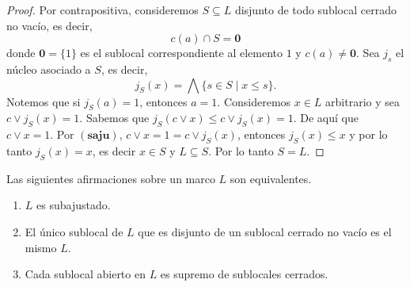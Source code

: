 \documentclass{comunicaciones}
\begin{document}
\begin{proof}
    Por contrapositiva, consideremos $S\subseteq L$ disjunto de todo sublocal cerrado no vacío, es decir, 
    \[c(a)\cap S=\mathbf{0}\]
    donde $\mathbf{0}=\{1\}$ es el sublocal correspondiente al elemento $1$ y $c(a)\neq \mathbf{0}$. Sea $j_s$ el núcleo asociado a $S$, es decir,
    \[
    j_S(x)=\bigwedge\{s\in S\mid x\leq s\}.
    \]
    Notemos que si $j_S(a)=1$, entonces $a=1$. Consideremos $x\in L$ arbitrario y sea $c\vee j_S(x)=1$. Sabemos que $j_S(c\vee x)\leq c\vee j_S(x)=1$. De aquí que $c\vee x=1$. Por $(\mathbf{saju})$, $c\vee x=1=c\vee j_S(x)$, entonces $j_S(x)\leq x$ y por lo tanto $j_S(x)=x$, es decir $x\in S$ y $L\subseteq S$. Por lo tanto $S=L$. 
\end{proof}

\begin{thm}\label{Saju2orden}
    Las siguientes afirmaciones sobre un marco $L$ son equivalentes.
    \begin{enumerate}[$i)$]
        \item $L$ es subajustado.
        \item El único sublocal de $L$ que es disjunto de un sublocal cerrado no vacío es el mismo $L$.
        \item Cada sublocal abierto en $L$ es supremo de sublocales cerrados.
    \end{enumerate}
\end{thm}
\end{document}
